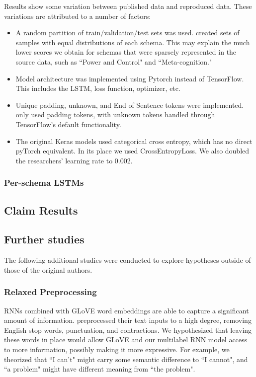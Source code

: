 \documentclass[11pt,a4paper]{article}
\begin{document}
Results show some variation between published data and reproduced data. These variations are attributed to a number of factors: 
\begin{itemize}
  \item A random partition of train/validation/test sets was used. \citeauthor{burger_2021} created sets of samples with equal distributions of each schema. This may explain the much lower scores we obtain for schemas that were sparsely represented in the source data, such as ``Power and Control" and ``Meta-cognition."
  \item Model architecture was implemented using Pytorch instead of TensorFlow. This includes the LSTM, loss function, optimizer, etc.
  \item Unique padding, unknown, and End of Sentence tokens were implemented. \citeauthor{burger_2021} only used padding tokens, with unknown tokens handled through TensorFlow's default functionality.
  \item The original Keras models used categorical cross entropy, which has no direct pyTorch equivalent. In its place we used CrossEntropyLoss. We also doubled the researchers' learning rate to 0.002.
\end{itemize}

\subsubsection{Per-schema LSTMs}
\subsection{Claim Results}


\subsection{Further studies}
\label{further_studies}
The following additional studies were conducted to explore hypotheses outside of those of the original authors. 
\subsubsection{Relaxed Preprocessing}
\label{section:relaxed_preprocessing}
RNNs combined with GLoVE word embeddings are able to capture a significant amount of information. \citeauthor{burger_2021} preprocessed their text inputs to a high degree, removing English stop words, punctuation, and contractions. We hypothesized that leaving these words in place would allow GLoVE and our multilabel RNN model access to more information, possibly making it more expressive. For example, we theorized that ``I can't" might carry some semantic difference to ``I cannot", and ``a problem" might have different meaning from ``the problem". 
\end{document}
